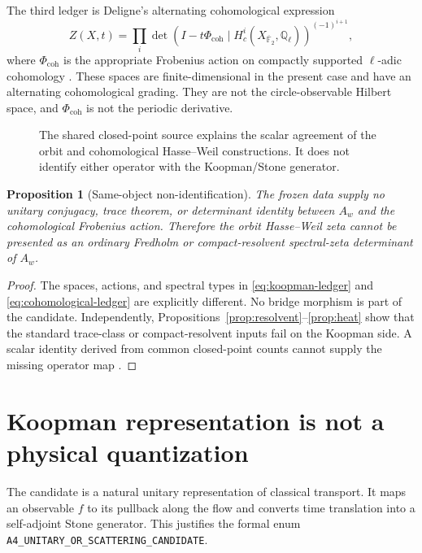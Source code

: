 \documentclass[11pt]{article}
\newtheorem{proposition}[theorem]{Proposition}
\theoremstyle{definition}
\theoremstyle{remark}
\newcommand{\F}{\mathbb{F}}
\begin{document}
The third ledger is Deligne's alternating cohomological expression
\begin{equation}
 Z(X,t)=\prod_i
 \det\!\left(I-t\Phi_{\mathrm{coh}}\mid
 H_c^i(X_{\overline{\F}_2},\mathbb Q_\ell)\right)^{(-1)^{i+1}},
 \label{eq:cohomological-ledger}
\end{equation}
where \(\Phi_{\mathrm{coh}}\) is the appropriate Frobenius action on
compactly supported \(\ell\)-adic cohomology
\citep[Eq.~(1.5.4)]{Deligne1974}.  These spaces are finite-dimensional in the
present case and have an alternating cohomological grading.  They are not the
circle-observable Hilbert space, and \(\Phi_{\mathrm{coh}}\) is not the
periodic derivative.

\begin{figure}[t]
  \centering
  
  \caption{The shared closed-point source explains the scalar agreement of
  the orbit and cohomological Hasse--Weil constructions.  It does not identify
  either operator with the Koopman/Stone generator.}
  \label{fig:ledgers}
\end{figure}

\begin{proposition}[Same-object non-identification]
\label{prop:nonidentification}
The frozen data supply no unitary conjugacy, trace theorem, or determinant
identity between \(A_w\) and the cohomological Frobenius action.  Therefore
the orbit Hasse--Weil zeta cannot be presented as an ordinary Fredholm or
compact-resolvent spectral-zeta determinant of \(A_w\).
\end{proposition}

\begin{proof}
The spaces, actions, and spectral types in
\eqref{eq:koopman-ledger} and \eqref{eq:cohomological-ledger} are explicitly
different.  No bridge morphism is part of the candidate.  Independently,
Propositions~\ref{prop:resolvent}--\ref{prop:heat} show that the standard
trace-class or compact-resolvent inputs fail on the Koopman side.  A scalar
identity derived from common closed-point counts cannot supply the missing
operator map \citep{WangTraceBridge2026}.
\end{proof}

\section{Koopman representation is not a physical quantization}
\label{sec:quantization}

The candidate is a natural unitary representation of classical transport.
It maps an observable \(f\) to its pullback along the flow and converts time
translation into a self-adjoint Stone generator.  This justifies the formal
enum \texttt{A4\_UNITARY\_OR\_SCATTERING\_CANDIDATE}.
\end{document}
